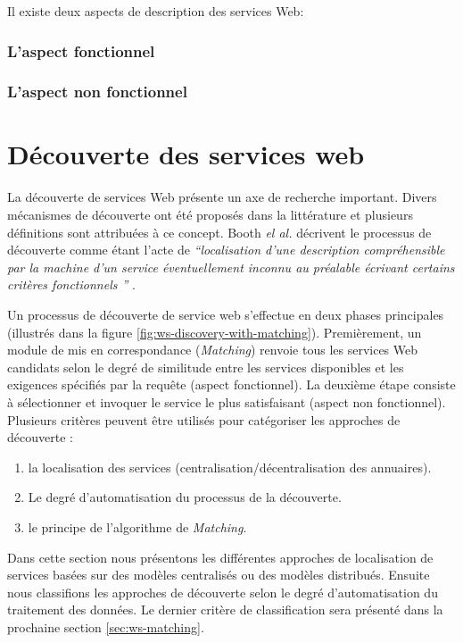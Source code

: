   Il existe deux aspects de description des services Web:

    \subsubsection{L'aspect fonctionnel}
    \label{sec:aspect-fonctionnel}

    \subsubsection{L'aspect non fonctionnel}
    \label{sec:aspect-non-fonctionel}

\newpage
\section{Découverte des services web}
\label{sec:ws-discovery}
La découverte de services Web présente un axe de recherche
important. Divers mécanismes de découverte ont été proposés dans la
littérature et plusieurs définitions sont attribuées à ce
concept. Booth \textit{el al.}  décrivent le processus de découverte
comme étant l'acte de \textit{``localisation d'une description
  compréhensible par la machine d'un service éventuellement inconnu au
  préalable écrivant certains critères fonctionnels ''}
\cite{booth2004web}.



Un processus de découverte de service web s'effectue en deux phases
principales (illustrés dans la figure
\ref{fig:ws-discovery-with-matching}). Premièrement, un module de mis
en correspondance (\textit{Matching}) renvoie tous les services Web
candidats selon le degré de similitude entre les services disponibles
et les exigences spécifiés par la requête (aspect fonctionnel). La
deuxième étape consiste à sélectionner et invoquer le service le plus
satisfaisant (aspect non fonctionnel). Plusieurs critères peuvent être
utilisés pour catégoriser les approches de découverte \cite{elie2010}:

\begin{enumerate}
\item la localisation des services (centralisation/décentralisation
  des annuaires).
\item Le degré d'automatisation du processus de la découverte.
\item le principe de l'algorithme de \textit{Matching}.
\end{enumerate}

Dans cette section nous présentons les différentes approches de
localisation de services basées sur des modèles centralisés ou des
modèles distribués. Ensuite nous classifions les approches de
découverte selon le degré d'automatisation du traitement des
données. Le dernier critère de classification sera présenté dans la
prochaine section \ref{sec:ws-matching}.

